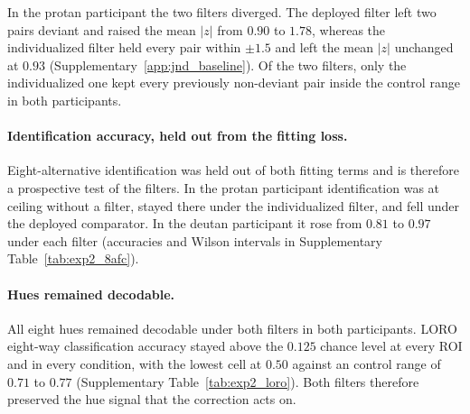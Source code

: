 In the protan participant the two filters diverged. The deployed filter left two pairs deviant and raised the mean $|z|$ from $0.90$ to $1.78$, whereas the individualized filter held every pair within $\pm 1.5$ and left the mean $|z|$ unchanged at $0.93$ (Supplementary~\cref{app:jnd_baseline}). Of the two filters, only the individualized one kept every previously non-deviant pair inside the control range in both participants.

\paragraph{Identification accuracy, held out from the fitting loss.}
Eight-alternative identification was held out of both fitting terms and is therefore a prospective test of the filters. In the protan participant identification was at ceiling without a filter, stayed there under the individualized filter, and fell under the deployed comparator. In the deutan participant it rose from $0.81$ to $0.97$ under each filter (accuracies and Wilson intervals in Supplementary Table~\ref{tab:exp2_8afc}).

\paragraph{Hues remained decodable.}
All eight hues remained decodable under both filters in both participants. LORO eight-way classification accuracy stayed above the $0.125$ chance level at every ROI and in every condition, with the lowest cell at $0.50$ against an control range of $0.71$ to $0.77$ (Supplementary Table~\ref{tab:exp2_loro}). Both filters therefore preserved the hue signal that the correction acts on.

